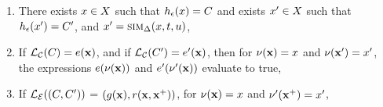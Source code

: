 \begin{enumerate}
\item
There exists $x \in X$ such that
$h_\epsilon(x) = C$ and exists $x' \in
X$ such that $h_\epsilon(x') = C'$,
and $x' = \mbox{\sc sim}_\Delta(x, t, u)$,
\item
If $\mathcal{L}_\mathcal{C}(C) =  e(\mathbf{x})$, and if
$\mathcal{L}_\mathcal{C}(C') = e'(\mathbf{x})$, then for $\nu(\mathbf{x}) =
x$ and $\nu(\mathbf{x}') = x'$, the expressions
$e(\nu(\mathbf{x}))$ and $e'(\nu'(\mathbf{x}))$ evaluate to true,
\item
If $\mathcal{L}_\mathcal{E}((C,C'))$ = $(g(\mathbf{x}), r(\mathbf{x},\mathbf{x}^{+}))$, 
for $\nu(\mathbf{x}) = x$ and $\nu'(\mathbf{x}^{+}) = x'$, 





\end{enumerate}
